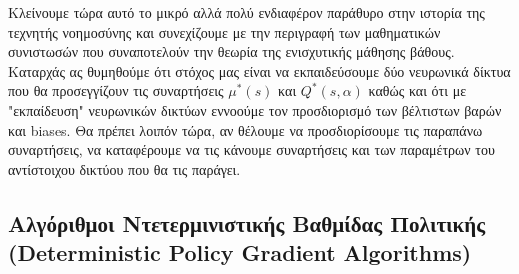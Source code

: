 \documentclass[11pt]{article} %
\numberwithin{equation}{subsection}
\begin{document}
Κλείνουμε τώρα αυτό το μικρό αλλά πολύ ενδιαφέρον παράθυρο στην ιστορία της τεχνητής νοημοσύνης και συνεχίζουμε με την περιγραφή των μαθηματικών συνιστωσών που συναποτελούν την θεωρία της ενισχυτικής μάθησης βάθους. Καταρχάς ας θυμηθούμε ότι στόχος μας είναι να εκπαιδεύσουμε δύο νευρωνικά δίκτυα που θα προσεγγίζουν τις συναρτήσεις $\mu^{*}(s)$ και $Q^{*}(s, \alpha)$ καθώς και ότι με "εκπαίδευση" νευρωνικών δικτύων εννοούμε τον προσδιορισμό των βέλτιστων βαρών και biases. Θα πρέπει λοιπόν τώρα, αν θέλουμε να προσδιορίσουμε τις παραπάνω συναρτήσεις, να καταφέρουμε να τις κάνουμε συναρτήσεις και των παραμέτρων του αντίστοιχου δικτύου που θα τις παράγει.

\subsection{Αλγόριθμοι Ντετερμινιστικής Βαθμίδας Πολιτικής (Deterministic Policy Gradient Algorithms)}
\end{document}

